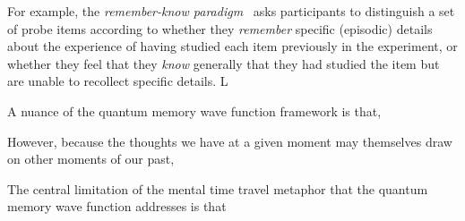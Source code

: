 For example, the \textit{remember-know paradigm}~\citep{Tulv85b} asks participants to distinguish a set of probe items according to whether they \textit{remember} specific (episodic) details about the experience of having studied each item previously in the experiment, or whether they feel that they \textit{know} generally that they had studied the item but are unable to recollect specific details.  L




A nuance of the quantum memory wave function framework is that, 

However, because the thoughts we have at a given moment may themselves draw on other moments of our past, 

The central limitation of the mental time travel metaphor that the quantum memory wave function addresses is that










